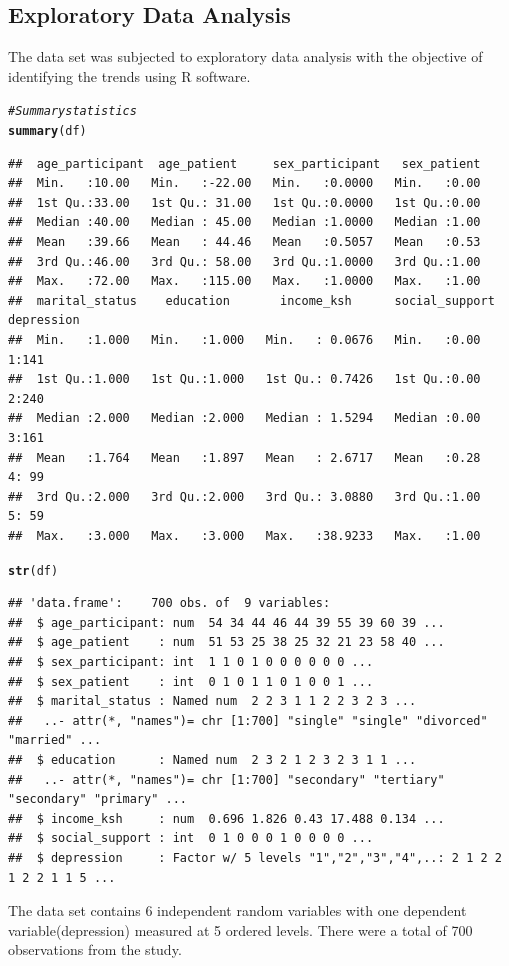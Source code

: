 \documentclass[12pt]{article}\usepackage[]{graphicx}\usepackage[]{xcolor}
\makeatletter
\newcommand{\hlcom}[1]{\textcolor[rgb]{0.678,0.584,0.686}{\textit{#1}}}%
\newcommand{\hlstd}[1]{\textcolor[rgb]{0.345,0.345,0.345}{#1}}%
\newcommand{\hlkwd}[1]{\textcolor[rgb]{0.737,0.353,0.396}{\textbf{#1}}}%
\newenvironment{kframe}{%
 \def\at@end@of@kframe{}%
 \ifinner\ifhmode%
  \def\at@end@of@kframe{\end{minipage}}%
  \begin{minipage}{\columnwidth}%
 \fi\fi%
 \def\FrameCommand##1{\hskip\@totalleftmargin \hskip-\fboxsep
 \colorbox{shadecolor}{##1}\hskip-\fboxsep
     \hskip-\linewidth \hskip-\@totalleftmargin \hskip\columnwidth}%
 \MakeFramed {\advance\hsize-\width
   \@totalleftmargin\z@ \linewidth\hsize
   \@setminipage}}%
 {\par\unskip\endMakeFramed%
 \at@end@of@kframe}
\newenvironment{knitrout}{}{} %
\numberwithin{equation}{section}
\numberwithin{figure}{section}
\makeatother
\begin{document}
\subsection{Exploratory Data Analysis}
The data set was subjected to exploratory data analysis with the objective of identifying the trends using R software.
\begin{knitrout}
\color{fgcolor}\begin{kframe}
\begin{alltt}
\hlcom{# Summary statistics}
\hlkwd{summary}\hlstd{(df)}
\end{alltt}
\begin{verbatim}
##  age_participant  age_patient     sex_participant   sex_patient  
##  Min.   :10.00   Min.   :-22.00   Min.   :0.0000   Min.   :0.00  
##  1st Qu.:33.00   1st Qu.: 31.00   1st Qu.:0.0000   1st Qu.:0.00  
##  Median :40.00   Median : 45.00   Median :1.0000   Median :1.00  
##  Mean   :39.66   Mean   : 44.46   Mean   :0.5057   Mean   :0.53  
##  3rd Qu.:46.00   3rd Qu.: 58.00   3rd Qu.:1.0000   3rd Qu.:1.00  
##  Max.   :72.00   Max.   :115.00   Max.   :1.0000   Max.   :1.00  
##  marital_status    education       income_ksh      social_support depression
##  Min.   :1.000   Min.   :1.000   Min.   : 0.0676   Min.   :0.00   1:141     
##  1st Qu.:1.000   1st Qu.:1.000   1st Qu.: 0.7426   1st Qu.:0.00   2:240     
##  Median :2.000   Median :2.000   Median : 1.5294   Median :0.00   3:161     
##  Mean   :1.764   Mean   :1.897   Mean   : 2.6717   Mean   :0.28   4: 99     
##  3rd Qu.:2.000   3rd Qu.:2.000   3rd Qu.: 3.0880   3rd Qu.:1.00   5: 59     
##  Max.   :3.000   Max.   :3.000   Max.   :38.9233   Max.   :1.00
\end{verbatim}
\begin{alltt}
\hlkwd{str}\hlstd{(df)}
\end{alltt}
\begin{verbatim}
## 'data.frame':	700 obs. of  9 variables:
##  $ age_participant: num  54 34 44 46 44 39 55 39 60 39 ...
##  $ age_patient    : num  51 53 25 38 25 32 21 23 58 40 ...
##  $ sex_participant: int  1 1 0 1 0 0 0 0 0 0 ...
##  $ sex_patient    : int  0 1 0 1 1 0 1 0 0 1 ...
##  $ marital_status : Named num  2 2 3 1 1 2 2 3 2 3 ...
##   ..- attr(*, "names")= chr [1:700] "single" "single" "divorced" "married" ...
##  $ education      : Named num  2 3 2 1 2 3 2 3 1 1 ...
##   ..- attr(*, "names")= chr [1:700] "secondary" "tertiary" "secondary" "primary" ...
##  $ income_ksh     : num  0.696 1.826 0.43 17.488 0.134 ...
##  $ social_support : int  0 1 0 0 0 1 0 0 0 0 ...
##  $ depression     : Factor w/ 5 levels "1","2","3","4",..: 2 1 2 2 1 2 2 1 1 5 ...
\end{verbatim}
\end{kframe}
\end{knitrout}
\noindent The data set contains 6 independent random variables with one dependent variable(depression) measured at 5 ordered levels. There were a total of 700 observations from the study.
\end{document}
